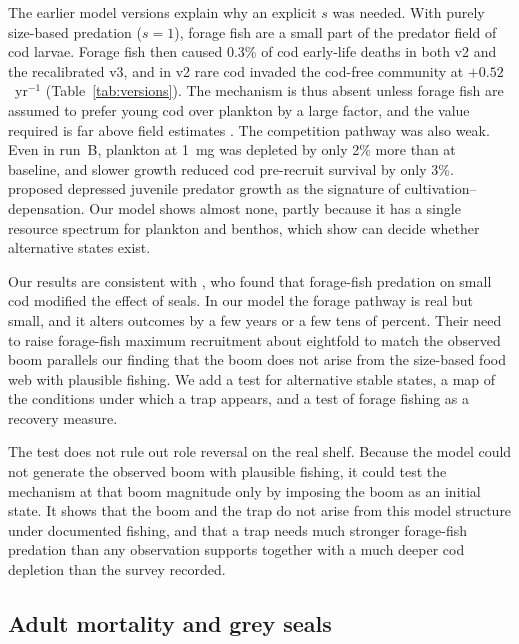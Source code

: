 \documentclass[12pt,letterpaper,fleqn]{article}
\newcommand{\yr}{yr$^{-1}$}
\begin{document}
The earlier model versions explain why an explicit $s$ was needed. With purely size-based predation ($s=1$), forage fish are a small part of the predator field of cod larvae. Forage fish then caused 0.3\% of cod early-life deaths in both v2 and the recalibrated v3, and in v2 rare cod invaded the cod-free community at $+0.52$~\yr{} (Table~\ref{tab:versions}). The mechanism is thus absent unless forage fish are assumed to prefer young cod over plankton by a large factor, and the value required is far above field estimates \autocite{daan1985predation,neumann2017quantifying}. The competition pathway was also weak. Even in run~B, plankton at 1~mg was depleted by only 2\% more than at baseline, and slower growth reduced cod pre-recruit survival by only 3\%. \textcite{gardmark2015regime} proposed depressed juvenile predator growth as the signature of cultivation--depensation. Our model shows almost none, partly because it has a single resource spectrum for plankton and benthos, which \textcite{vanleeuwen2013predators} show can decide whether alternative states exist.

Our results are consistent with \textcite{adekoya2026reexamining}, who found that forage-fish predation on small cod modified the effect of seals. In our model the forage pathway is real but small, and it alters outcomes by a few years or a few tens of percent. Their need to raise forage-fish maximum recruitment about eightfold to match the observed boom parallels our finding that the boom does not arise from the size-based food web with plausible fishing. We add a test for alternative stable states, a map of the conditions under which a trap appears, and a test of forage fishing as a recovery measure.

The test does not rule out role reversal on the real shelf. Because the model could not generate the observed boom with plausible fishing, it could test the mechanism at that boom magnitude only by imposing the boom as an initial state. It shows that the boom and the trap do not arise from this model structure under documented fishing, and that a trap needs much stronger forage-fish predation than any observation supports together with a much deeper cod depletion than the survey recorded.

\subsection{Adult mortality and grey seals}
\end{document}
